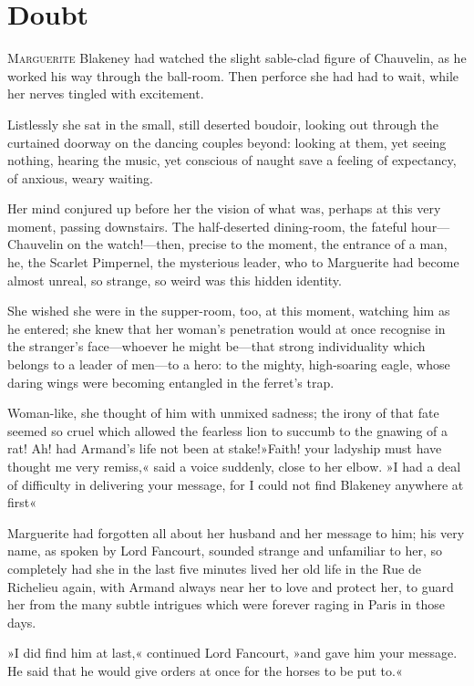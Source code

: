 
\chapter{Doubt}
\lettrine[lines=4]{M}{arguerite} Blakeney had watched the slight sable-clad figure of Chauvelin, as he worked his way through the ball-room. Then perforce she had had to wait, while her nerves tingled with excitement.

Listlessly she sat in the small, still deserted boudoir, looking out through the curtained doorway on the dancing couples beyond: looking at them, yet seeing nothing, hearing the music, yet conscious of naught save a feeling of expectancy, of anxious, weary waiting.

Her mind conjured up before her the vision of what was, perhaps at this very moment, passing downstairs. The half-deserted dining-room, the fateful hour—Chauvelin on the watch!—then, precise to the moment, the entrance of a man, he, the Scarlet Pimpernel, the mysterious leader, who to Marguerite had become almost unreal, so strange, so weird was this hidden identity.

She wished she were in the supper-room, too, at this moment, watching him as he entered; she knew that her woman's penetration would at once recognise in the  stranger's face—whoever he might be—that strong individuality which belongs to a leader of men—to a hero: to the mighty, high-soaring eagle, whose daring wings were becoming entangled in the ferret's trap.

Woman-like, she thought of him with unmixed sadness; the irony of that fate seemed so cruel which allowed the fearless lion to succumb to the gnawing of a rat! Ah! had Armand's life not been at stake!\textellipsis \allowbreak  »Faith! your ladyship must have thought me very remiss,« said a voice suddenly, close to her elbow. »I had a deal of difficulty in delivering your message, for I could not find Blakeney anywhere at first\textellipsis«

Marguerite had forgotten all about her husband and her message to him; his very name, as spoken by Lord Fancourt, sounded strange and unfamiliar to her, so completely had she in the last five minutes lived her old life in the Rue de Richelieu again, with Armand always near her to love and protect her, to guard her from the many subtle intrigues which were forever raging in Paris in those days.

»I did find him at last,« continued Lord Fancourt, »and gave him your message. He said that he would give orders at once for the horses to be put to.«

